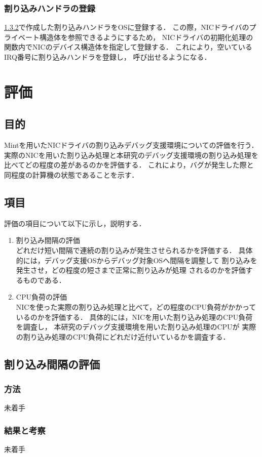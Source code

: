 \documentclass[tanilab-enum]{graduate}
\begin{document}
\subsection{割り込みハンドラの登録}
\ref{}で作成した割り込みハンドラをOSに登録する．
この際，NICドライバのプライベート構造体を参照できるようにするため，
NICドライバの初期化処理の関数内でNICのデバイス構造体を指定して登録する．
これにより，空いているIRQ番号に割り込みハンドラを登録し，
呼び出せるようになる．
\chapter{評価}\label{estimaion}
\section{目的}
Mintを用いたNICドライバの割り込みデバッグ支援環境についての評価を行う．
実際のNICを用いた割り込み処理と本研究のデバッグ支援環境の割り込み処理を
比べてどの程度の差があるのかを評価する．
これにより，バグが発生した際と同程度の計算機の状態であることを示す．
\section{項目}
評価の項目について以下に示し，説明する．
\begin{enumerate}
    \item 割り込み間隔の評価\\
        どれだけ短い間隔で連続の割り込みが発生させられるかを評価する．
        具体的には，デバッグ支援OSからデバッグ対象OSへ間隔を調整して
        割り込みを発生させ，どの程度の短さまで正常に割り込みが処理
        されるのかを評価するものである．
    \item CPU負荷の評価\\
        NICを使った実際の割り込み処理と比べて，どの程度のCPU負荷がかかって
        いるのかを評価する．
        具体的には，NICを用いた割り込み処理のCPU負荷を調査し，
        本研究のデバッグ支援環境を用いた割り込み処理のCPUが
        実際の割り込み処理のCPU負荷にどれだけ近付いているかを調査する．
\end{enumerate}
\section{割り込み間隔の評価}
    \subsection{方法}
    未着手
    \subsection{結果と考察}
    未着手
\end{document}
